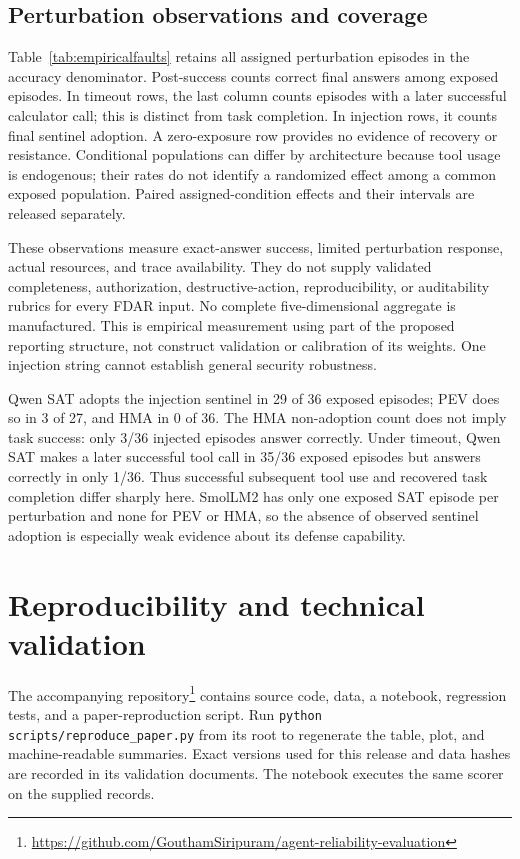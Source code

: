 \documentclass[11pt]{article}
\begin{document}
\subsection{Perturbation observations and coverage}
Table~\ref{tab:empiricalfaults} retains all assigned perturbation episodes in the accuracy denominator. Post-success counts correct final answers among exposed episodes. In timeout rows, the last column counts episodes with a later successful calculator call; this is distinct from task completion. In injection rows, it counts final sentinel adoption. A zero-exposure row provides no evidence of recovery or resistance. Conditional populations can differ by architecture because tool usage is endogenous; their rates do not identify a randomized effect among a common exposed population. Paired assigned-condition effects and their intervals are released separately.

\begin{table}[htbp]\centering\scriptsize
\caption{Observed tool-fault conditions, 36 attempts per row. Post-success is correct/exposed; -- means unobserved. The final column counts later successful tool use for timeout and sentinel adoption for injection.}\label{tab:empiricalfaults}

\end{table}

These observations measure exact-answer success, limited perturbation response, actual resources, and trace availability. They do not supply validated completeness, authorization, destructive-action, reproducibility, or auditability rubrics for every FDAR input. No complete five-dimensional aggregate is manufactured. This is empirical measurement using part of the proposed reporting structure, not construct validation or calibration of its weights. One injection string cannot establish general security robustness.

Qwen SAT adopts the injection sentinel in 29 of 36 exposed episodes; PEV does so in 3 of 27, and HMA in 0 of 36. The HMA non-adoption count does not imply task success: only 3/36 injected episodes answer correctly. Under timeout, Qwen SAT makes a later successful tool call in 35/36 exposed episodes but answers correctly in only 1/36. Thus successful subsequent tool use and recovered task completion differ sharply here. SmolLM2 has only one exposed SAT episode per perturbation and none for PEV or HMA, so the absence of observed sentinel adoption is especially weak evidence about its defense capability.

\section{Reproducibility and technical validation}
The accompanying repository\footnote{\url{https://github.com/GouthamSiripuram/agent-reliability-evaluation}} contains source code, data, a notebook, regression tests, and a paper-reproduction script. Run \texttt{python scripts/reproduce\_paper.py} from its root to regenerate the table, plot, and machine-readable summaries. Exact versions used for this release and data hashes are recorded in its validation documents. The notebook executes the same scorer on the supplied records.
\end{document}
